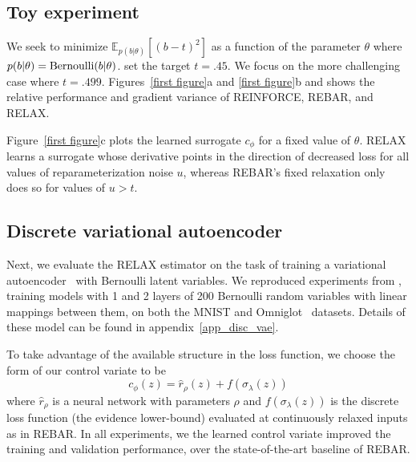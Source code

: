 \documentclass{article}
\newcommand{\relaxed}{r}
\newcommand{\RELAX}{{\textnormal{RELAX}}}
\begin{document}
\subsection{Toy experiment}
We seek to minimize $\mathbb{E}_{p(b|\theta)}[(b - t)^2]$ as a function of the parameter $\theta$ where {$p(b|\theta) = \textnormal{Bernoulli}(b|\theta)$}. \cite{tucker2017rebar} set the target $t = .45$.
We focus on the more challenging case where $t = .499$.
Figures~\ref{first figure}a and \ref{first figure}b and shows the relative performance and gradient variance of REINFORCE, REBAR, and RELAX.

Figure~\ref{first figure}c plots the learned surrogate $c_\phi$ for a fixed value of $\theta$.
RELAX learns a surrogate whose derivative points in the direction of decreased loss for all values of reparameterization noise $u$, whereas REBAR's fixed relaxation only does so for values of $u > t$.


\subsection{Discrete variational autoencoder}
Next, we evaluate the \RELAX{} estimator on the task of training a variational autoencoder~\citep{kingma2013autoencoding, rezende2014stochastic} with Bernoulli latent variables.
We reproduced experiments from \citet{tucker2017rebar}, training models with 1 and 2 layers of 200 Bernoulli random variables with linear mappings between them, on both  the MNIST and Omniglot~\citep{lake2015human} datasets.
Details of these model can be found in appendix~\ref{app_disc_vae}.


To take advantage of the available structure in the loss function, we choose the form of our control variate to be $$ c_\phi(z) = \hat{r}_\rho(z) + f(\sigma_\lambda(z))$$ where $\hat{r}_\rho$ is a neural network with parameters $\rho$ and $f(\sigma_\lambda(z))$ is the discrete loss function (the evidence lower-bound) evaluated at continuously relaxed inputs as in REBAR.  
%
In all experiments, we the learned control variate improved the training and validation performance, over the state-of-the-art baseline of REBAR. 
\end{document}
